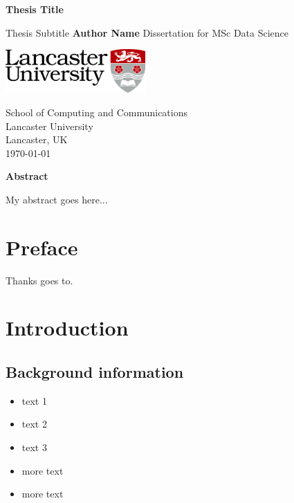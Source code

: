 \documentclass[
  openany]{book}
\author{My Name}
\date{2019}
\makeatletter
\providecommand{\tightlist}{%
  \setlength{\itemsep}{0pt}\setlength{\parskip}{0pt}}
\newcommand\abstractname{Abstract}
\newenvironment{abstract}{%
      \titlepage
      \null\vfil
      \@beginparpenalty\@lowpenalty
      \begin{center}%
        \bfseries \abstractname
        \@endparpenalty\@M
      \end{center}}%
     {\par\vfil\null\endtitlepage}
\newenvironment{abstract}{%
      \if@twocolumn
        \section*{\abstractname}%
      \else
        \small
        \begin{center}%
          {\bfseries \abstractname\vspace{-.5em}\vspace{\z@}}%
        \end{center}%
        \quotation
      \fi}
      {\if@twocolumn\else\endquotation\fi}
\makeatother
\begin{document}
\frontmatter

\begin{titlepage}
\begin{center}
\vspace*{5cm}
\Huge{\textbf{Thesis Title}}

\vspace*{3cm}
\Large{Thesis Subtitle}
\vfill
\Large{\textbf{Author Name}}
\vfill
Dissertation for MSc Data Science

\vspace{0.8cm}
\includegraphics[width=0.4\textwidth]{img/lu-logo-cmyk.jpg}

School of Computing and Communications\\
Lancaster University\\
Lancaster, UK\\
\today
\end{center}
\end{titlepage}


\thispagestyle{empty}


\begin{abstract}
My abstract goes here...
\end{abstract}

\newpage

\chapter*{Preface}

Thanks goes to.

\setcounter{page}{1}

{
\setcounter{tocdepth}{1}
\tableofcontents
}
\listoftables
\listoffigures
\mainmatter
\hypertarget{introduction}{%
\chapter{Introduction}\label{introduction}}

\hypertarget{background-information}{%
\section{Background information}\label{background-information}}

\begin{itemize}
\tightlist
\item
  text 1
\item
  text 2
\item
  text 3
\item
  more text
\item
  more text
\end{itemize}
\end{document}
